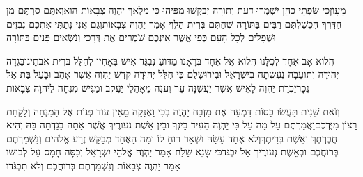 \documentclass[../main/main.tex]{subfiles}
\begin{document}
\begin{multicols*}{\ncols}
מֵעָוֺן\PreVerseSpace{}כִּי שִׂפְתֵי כֹהֵן יִשְׁמְרוּ דַעַת וְתוֹרָה יְבַקְשׁוּ מִפִּיהוּ כִּי מַלְאַךְ יַהְוֶה צְבָאוֹת הוּא\PreVerseSpace{}וְאַתֶּם סַרְתֶּם מִן הַדֶּרֶךְ הִכְשַׁלְתֶּם רַבִּים בַּתּוֹרָה שִׁחַתֶּם בְּרִית הַלֵּוִי אָמַר יַהְוֶה צְבָאוֹת\PreVerseSpace{}וְגַם אֲנִי נָתַתִּי אֶתְכֶם נִבְזִים וּשְׁפָלִים לְכָל הָעָם כְּפִי אֲשֶׁר אֵינְכֶם שֹׁמְרִים אֶת דְּרָכַי וְנֹשְׂאִים פָּנִים בַּתּוֹרָה\OpenSection{}\par
{}הֲלוֹא אָב אֶחָד לְכֻלָּנוּ הֲלוֹא אֵל אֶחָד בְּרָאָנוּ מַדּוּעַ נִבְגַּד אִישׁ בְּאָחִיו לְחַלֵּל בְּרִית אֲבֹתֵינוּ\PreVerseSpace{}בָּגְדָה יְהוּדָה וְתוֹעֵבָה נֶעֶשְׂתָה בְיִשְׂרָאֵל וּבִירוּשָׁלֵם כִּי חִלֵּל יְהוּדָה קֹדֶשׁ יַהְוֶה אֲשֶׁר אָהֵב וּבָעַל בַּת אֵל נֵכָר\PreVerseSpace{}יַכְרֵת יַהְוֶה לָאִישׁ אֲשֶׁר יַעֲשֶׂנָּה עֵר וְעֹנֶה מֵאָהֳלֵי יַעֲקֹב וּמַגִּישׁ מִנְחָה לַיהוָה צְבָאוֹת\OpenSection{}\par
{}וְזֹאת שֵׁנִית תַּעֲשׂוּ כַּסּוֹת דִּמְעָה אֶת מִזְבַּח יַהְוֶה בְּכִי וַאֲנָקָה מֵאֵין עוֹד פְּנוֹת אֶל הַמִּנְחָה וְלָקַחַת רָצוֹן מִיֶּדְכֶם\PreVerseSpace{}וַאֲמַרְתֶּם עַל מָה עַל כִּי יַהְוֶה הֵעִיד בֵּינְךָ וּבֵין אֵשֶׁת נְעוּרֶיךָ אֲשֶׁר אַתָּה בָּגַדְתָּה בָּהּ וְהִיא חֲבֶרְתְּךָ וְאֵשֶׁת בְּרִיתֶךָ\PreVerseSpace{}וְלֹא אֶחָד עָשָׂה וּשְׁאָר רוּחַ לוֹ וּמָה הָאֶחָד מְבַקֵּשׁ זֶרַע אֱלֹהִים וְנִשְׁמַרְתֶּם בְּרוּחֲכֶם וּבְאֵשֶׁת נְעוּרֶיךָ אַל יִבְגֹּד\PreVerseSpace{}כִּי שָׂנֵא שַׁלַּח אָמַר יַהְוֶה אֱלֹהֵי יִשְׂרָאֵל וְכִסָּה חָמָס עַל לְבוּשׁוֹ אָמַר יַהְוֶה צְבָאוֹת וְנִשְׁמַרְתֶּם בְּרוּחֲכֶם וְלֹא תִבְגֹּדוּ\OpenSection{}\par

\end{multicols*}
\end{document}
